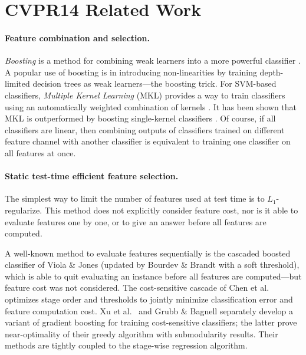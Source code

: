 \section{CVPR14 Related Work}

\paragraph{Feature combination and selection.}
\emph{Boosting} is a method for combining weak learners into a more powerful classifier \parencite{Hastie2009}.
A popular use of boosting is in introducing non-linearities by training depth-limited decision trees as weak learners---the boosting trick.
For SVM-based classifiers, \emph{Multiple Kernel Learning} (MKL) provides a way to train classifiers using an automatically weighted combination of kernels \parencite{Lanckriet2004}.
It has been shown that MKL is outperformed by boosting single-kernel classifiers \parencite{Gehler2009}.
Of course, if all classifiers are linear, then combining outputs of classifiers trained on different feature channel with another classifier is equivalent to training one classifier on all features at once.

\paragraph{Static test-time efficient feature selection.}
The simplest way to limit the number of features used at test time is to $L_1$-regularize.
This method does not explicitly consider feature cost, nor is it able to evaluate features one by one, or to give an answer before all features are computed.

A well-known method to evaluate features sequentially is the cascaded boosted classifier of Viola \& Jones \parencite{Viola2004} (updated by Bourdev \& Brandt \parencite{Bourdev-CVPR-2005} with a soft threshold), which is able to quit evaluating an instance before all features are computed---but feature cost was not considered.
The cost-sensitive cascade of Chen et al.\ \parencite{Chen-AISTATS-2012} optimizes stage order and thresholds to jointly minimize classification error and feature computation cost.
Xu et al.\ \parencite{Xu-ICML-2012} and Grubb \& Bagnell \parencite{Grubb-AISTATS-2012} separately develop a variant of gradient boosting for training cost-sensitive classifiers; the latter prove near-optimality of their greedy algorithm with submodularity results.
Their methods are tightly coupled to the stage-wise regression algorithm.

